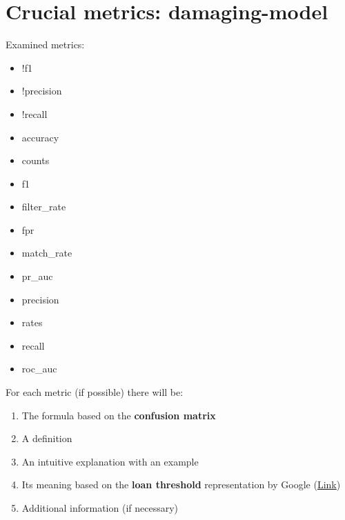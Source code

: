 \documentclass[12pt,a4paper]{article}
\begin{document}
\section{Crucial metrics: \textbf{damaging}-model}
Examined metrics:
\begin{itemize}
\item !f1
\item !precision
\item !recall
\item accuracy
\item counts
\item f1
\item filter\_rate
\item fpr
\item match\_rate
\item pr\_auc
\item precision
\item rates
\item recall
\item roc\_auc
\end{itemize}
For each metric (if possible) there will be:
\begin{enumerate}
\item The formula based on the \textbf{confusion matrix}
\item A definition
\item An intuitive explanation with an example
\item Its meaning based on the \textbf{loan threshold} representation by Google (\href{https://research.google.com/bigpicture/attacking-discrimination-in-ml/}{Link})
\item Additional information (if necessary)
\end{enumerate}
\end{document}
